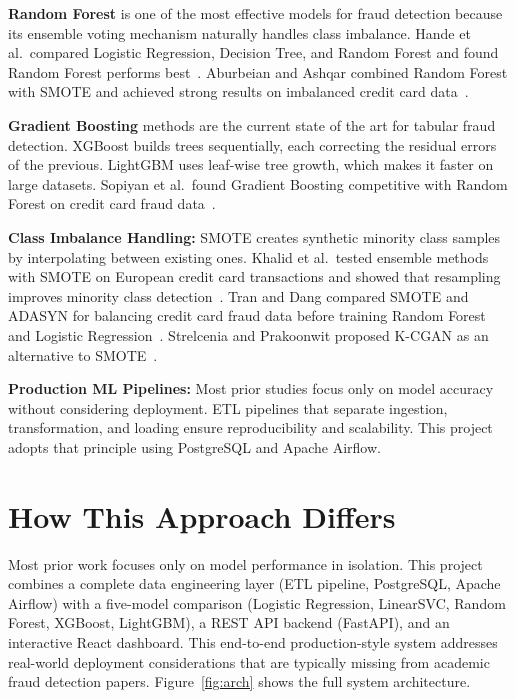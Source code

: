 \documentclass{article}
\begin{document}
\textbf{Random Forest} is one of the most effective models for fraud
detection because its ensemble voting mechanism naturally handles class
imbalance. Hande et al.\ compared Logistic Regression, Decision Tree, and
Random Forest and found Random Forest performs best~\cite{hande2019credit}.
Aburbeian and Ashqar combined Random Forest with SMOTE and achieved strong
results on imbalanced credit card data~\cite{aburbeian2023credit}.

\textbf{Gradient Boosting} methods are the current state of the art for
tabular fraud detection. XGBoost builds trees sequentially, each
correcting the residual errors of the previous. LightGBM uses leaf-wise
tree growth, which makes it faster on large datasets. Sopiyan et al.\
found Gradient Boosting competitive with Random Forest on credit card
fraud data~\cite{sopiyan2022fraud}.

\textbf{Class Imbalance Handling:} SMOTE creates synthetic minority class
samples by interpolating between existing ones. Khalid et al.\ tested
ensemble methods with SMOTE on European credit card transactions and showed
that resampling improves minority class
detection~\cite{khalid2024enhancing}. Tran and Dang compared SMOTE and
ADASYN for balancing credit card fraud data before training Random Forest
and Logistic Regression~\cite{tran2021machine}. Strelcenia and Prakoonwit
proposed K-CGAN as an alternative to SMOTE~\cite{strelcenia2023improving}.

\textbf{Production ML Pipelines:} Most prior studies focus only on model
accuracy without considering deployment. ETL pipelines that separate
ingestion, transformation, and loading ensure reproducibility and
scalability. This project adopts that principle using PostgreSQL and
Apache Airflow.

\section{How This Approach Differs}

Most prior work focuses only on model performance in isolation. This
project combines a complete data engineering layer (ETL pipeline,
PostgreSQL, Apache Airflow) with a five-model comparison (Logistic
Regression, LinearSVC, Random Forest, XGBoost, LightGBM), a REST API
backend (FastAPI), and an interactive React dashboard. This end-to-end
production-style system addresses real-world deployment considerations
that are typically missing from academic fraud detection papers.
Figure~\ref{fig:arch} shows the full system architecture.
\end{document}
